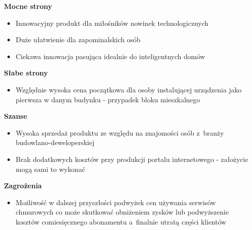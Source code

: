 \documentclass[../main.tex]{subfiles}
\begin{document}
 {

    \noindent\textbf{Mocne strony}
    \begin{itemize}
        \item Innowacyjny produkt dla miłośników nowinek technologicznych
        \item Duże ułatwienie dla zapominalskich osób
        \item Ciekawa innowacja pasująca idealnie do inteligentnych domów
    \end{itemize}
    \bigskip

    \noindent\textbf{Słabe strony}
    \begin{itemize}
        \item Względnie wysoka cena początkowa dla osoby instalującej urządzenia jako
        pierwsza w danym budynku - przypadek bloku mieszkalnego
    \end{itemize}
    \bigskip

    \noindent\textbf{Szanse}
    \begin{itemize}
        \item Wysoka sprzedaż produktu ze względu na znajomości osób z~branży
        budowlano-deweloperskiej
        \item Brak dodatkowych kosztów przy produkcji portalu internetowego - założycie
        mogą sami to wykonać
    \end{itemize}
    \bigskip

    \noindent\textbf{Zagrożenia}
    \begin{itemize}
        \item Możliwość w dalszej przyszłości podwyżek cen używania serwisów chmurowych
        co może skutkować obniżeniem zysków lub podwyższenie kosztów comiesięcznego
        abonamentu a~finalnie utratą części klientów
    \end{itemize}
    \bigskip
}
\end{document}
